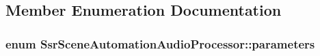 \subsection{Member Enumeration Documentation}
\hypertarget{classSsrSceneAutomationAudioProcessor_ae03aeb4847a435789be1b6112a7d92dd}{
\subsubsection[{parameters}]{\setlength{\rightskip}{0pt plus 5cm}enum {\bf Ssr\-Scene\-Automation\-Audio\-Processor\-::parameters}}}\label{classSsrSceneAutomationAudioProcessor_ae03aeb4847a435789be1b6112a7d92dd}
